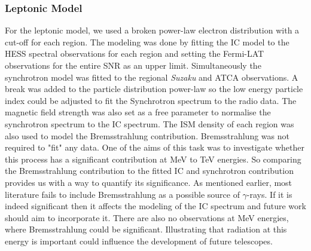\documentclass[12pt,a4paper]{article}
\begin{document}
\subsubsection{Leptonic Model}
For the leptonic model, we used a broken power-law electron distribution with a cut-off for each region. The modeling was done by fitting the IC model to the HESS spectral observations for each region and setting the Fermi-LAT observations for the entire SNR as an upper limit. Simultaneously the synchrotron model was fitted to the regional \textit{Suzaku} and ATCA observations. A break was added to the particle distribution power-law so the low energy particle index could be adjusted to fit the Synchrotron spectrum to the radio data. The magnetic field strength was also set as a free parameter to normalise the synchrotron spectrum to the IC spectrum. The ISM density of each region was also used to model the Bremsstrahlung contribution. Bremsstrahlung was not required to "fit" any data. One of the aims of this task was to investigate whether this process has a significant contribution at MeV to TeV energies. So comparing the Bremsstrahlung contribution to the fitted IC and synchrotron contribution provides us with a way to quantify its significance. As mentioned earlier, most literature fails to include Bremsstrahlung as a possible source of $\gamma$-rays. If it is indeed significant then it affects the modeling of the IC spectrum and future work should aim to incorporate it. There are also no observations at MeV energies, where Bremsstrahlung could be significant. Illustrating that radiation at this energy is important could influence the development of future telescopes. 
\end{document}
